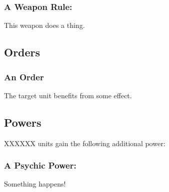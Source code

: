 \subsubsection*{A Weapon Rule:} This weapon does a thing.



\subsection*{Orders}

\subsubsection*{An Order} The target unit benefits from some effect.



\subsection*{Powers}

XXXXXX units gain the following additional power:

\subsubsection*{A Psychic Power:} Something happens!


\pagebreak



